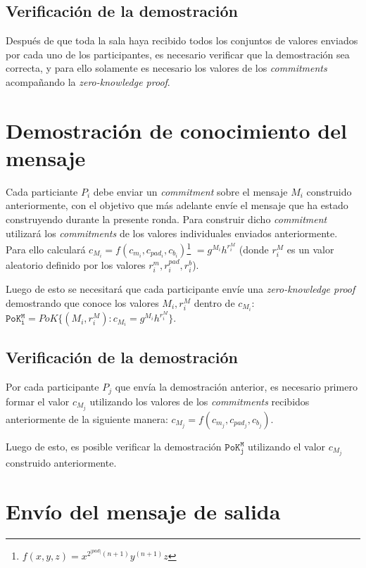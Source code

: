 \subsection{Verificación de la demostración}

Después de que toda la sala haya recibido todos los conjuntos de valores enviados por cada uno de los participantes, es necesario verificar que la demostración sea correcta, y para ello solamente es necesario los valores de los \emph{commitments} acompañando la \emph{zero-knowledge proof}.

\section{Demostración de conocimiento del mensaje}

Cada particiante $P_i$ debe enviar un \emph{commitment} sobre el mensaje $M_i$ construido anteriormente, con el objetivo que más adelante envíe el mensaje que ha estado construyendo durante la presente ronda. Para construir dicho \emph{commitment} utilizará los \emph{commitments} de los valores individuales enviados anteriormente. Para ello calculará $c_{M_i} = f(c_{m_i}, c_{pad_i}, c_{b_i})$\footnote{$f(x, y, z) = x^{2^{|pad|}(n+1)} y^{(n+1)} z$} $= g^{M_i} h^{r_i^{M}}$ (donde $r_i^{M}$ es un valor aleatorio definido por los valores $r_i^m, r_i^{pad}, r_i^b$). 

Luego de esto se necesitará que cada participante envíe una \emph{zero-knowledge proof} demostrando que conoce los valores $M_i, r_i^M$ dentro de $c_{M_i}$: $\mathtt{PoK_i^M} = PoK\{(M_i, r_i^M) : c_{M_i} = g^{M_i} h^{r_i^M}\}$.

\subsection{Verificación de la demostración}

Por cada participante $P_j$ que envía la demostración anterior, es necesario primero formar el valor $c_{M_j}$ utilizando los valores de los \emph{commitments} recibidos anteriormente de la siguiente manera: $c_{M_j} = f(c_{m_j}, c_{pad_j}, c_{b_j})$.

Luego de esto, es posible verificar la demostración $\mathtt{PoK_j^M}$ utilizando el valor $c_{M_j}$ construido anteriormente.

\section{Envío del mensaje de salida}

